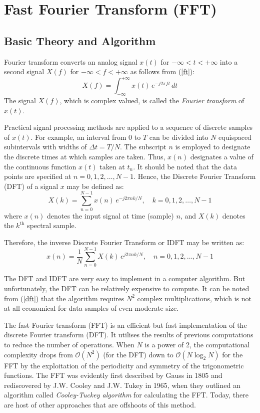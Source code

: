 \documentclass[a4paper,11pt]{article}
\begin{document}
\section{Fast Fourier Transform (FFT)}
\subsection{Basic Theory and Algorithm} \label{fftbas}
Fourier transform converts an analog signal $x(t)$ for $-\infty < t < +\infty$ into a second signal $X(f)$ for $-\infty < f < +\infty$ as follows from (\ref{ft}):
\begin{equation}
X(f) = \int_{-\infty}^{+\infty} x(t)\,e^{-j2\pi ft}\,dt
\end{equation}
The signal $X(f)$, which is complex valued, is called the \emph{Fourier transform} of $x(t)$.

Practical signal processing methods are applied to a sequence of discrete samples of $x(t)$. For example, an interval from 0 to $T$ can be divided into $N$ equispaced subintervals with widths of $\Delta t = T/N$. The subscript $n$ is employed to designate the discrete times at which samples are taken. Thus, $x(n)$ designates a value of the continuous function $x(t)$ taken at $t_{n}$. It should be noted that the data points are specified at $n=0,1,2,\ldots,N-1$. Hence, the Discrete Fourier Transform (DFT) of a signal $x$ may be defined as:
\begin{equation} \label{dft}
X(k) = \sum^{N-1}_{n=0} x(n)\,e^{-j2\pi n k/N}, \quad k=0,1,2,\ldots,N-1
\end{equation}
where $x(n)$ denotes the input signal at time (sample) $n$, and $X(k)$ denotes the $k^{\mathrm{th}}$ spectral sample.

Therefore, the inverse Discrete Fourier Transform or IDFT may be written as:
\begin{equation}
x(n) = \frac{1}{N} \sum^{N-1}_{n=0} X(k)\,e^{j2\pi n k/N}, \quad n=0,1,2,\ldots,N-1
\end{equation}

The DFT and IDFT are very easy to implement in a computer algorithm. But unfortunately, the DFT can be relatively expensive to compute. It can be noted from (\ref{dft}) that the algorithm requires $N^{2}$ complex multiplications, which is not at all economical for data samples of even moderate size. 

The fast Fourier transform (FFT) is an efficient but fast implementation of the discrete Fourier transform (DFT). It utilises the results of previous computations to reduce the number of operations. When $N$ is a power of 2, the computational complexity drops from ${\mathcal O}(N^2)$ (for the DFT) down to ${\mathcal O}(N\log_{2} N)$ for the FFT by the exploitation of the periodicity and symmetry of the trigonometric functions. The FFT was evidently first described by Gauss in 1805 and rediscovered by J.W. Cooley and J.W. Tukey in 1965, when they outlined an algorithm called \emph{Cooley-Tuckey algorithm} for calculating the FFT. Today, there are host of other approaches that are offshoots of this method. \cite{schilling}
\end{document}
